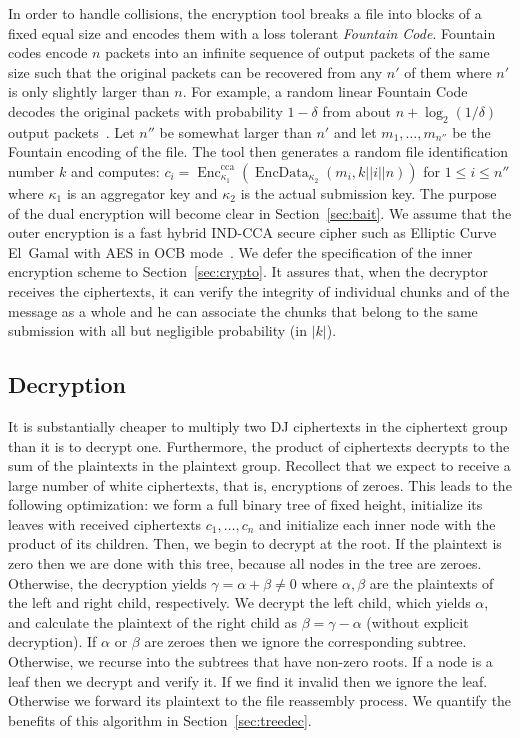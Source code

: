 \documentclass[twocolumn,10pt]{article}
\DeclareMathOperator{\Enc}{Enc}
\DeclareMathOperator{\EncData}{EncData}
\begin{document}
In order to handle collisions, the encryption tool breaks a file into blocks
of a fixed equal size and encodes them with a loss tolerant \emph{Fountain
  Code}.  Fountain codes encode $n$ packets into an infinite sequence of
output packets of the same size such that the original packets can be
recovered from any $n'$ of them where $n'$ is only slightly larger than $n$.
For example, a random linear Fountain Code decodes the original packets with
probability $1-\delta$ from about $n+\log_2(1/\delta)$ output
packets~\cite{MacKay2005}.  Let $n''$ be somewhat larger than $n'$ and let
$m_1,\dots,m_{n''}$ be the Fountain encoding of the file.  The tool then
generates a random file identification number $k$ and computes: $c_i
=\Enc_{\kappa_1}^{\text{cca}}(\EncData_{\kappa_2}(m_i, k || i || n))$ for
$1\le i\le n''$ where $\kappa_1$ is an aggregator key and $\kappa_2$ is the
actual submission key.  The purpose of the dual encryption will become clear
in Section~\ref{sec:bait}.  We assume that the outer encryption is a fast
hybrid IND-CCA secure cipher such as Elliptic Curve El~Gamal with AES in OCB
mode~\cite{RogawayBB2003}.  We defer the specification of the inner
encryption scheme to Section~\ref{sec:crypto}.  It assures that, when the
decryptor receives the ciphertexts, it can verify the integrity of
individual chunks and of the message as a whole and he can associate the
chunks that belong to the same submission with all but negligible
probability (in $|k|$).







\subsection{Decryption}

It is substantially cheaper to multiply two DJ ciphertexts in the ciphertext
group than it is to decrypt one.  Furthermore, the product of ciphertexts
decrypts to the sum of the plaintexts in the plaintext group.  Recollect
that we expect to receive a large number of white ciphertexts, that is,
encryptions of zeroes.  This leads to the following optimization: we form a
full binary tree of fixed height, initialize its leaves with received
ciphertexts $c_1,\dots,c_n$ and initialize each inner node with the product
of its children.  Then, we begin to decrypt at the root.  If the plaintext
is zero then we are done with this tree, because all nodes in the tree are
zeroes.  Otherwise, the decryption yields $\gamma=\alpha+\beta\neq 0$ where
$\alpha,\beta$ are the plaintexts of the left and right child, respectively.
We decrypt the left child, which yields $\alpha$, and calculate the
plaintext of the right child as $\beta=\gamma-\alpha$ (without explicit
decryption).  If $\alpha$ or $\beta$ are zeroes then we ignore the
corresponding subtree.  Otherwise, we recurse into the subtrees that have
non-zero roots.  If a node is a leaf then we decrypt and verify it.  If we
find it invalid then we ignore the leaf.  Otherwise we forward its plaintext
to the file reassembly process.  We quantify the benefits of this algorithm
in Section~\ref{sec:treedec}.
\end{document}
